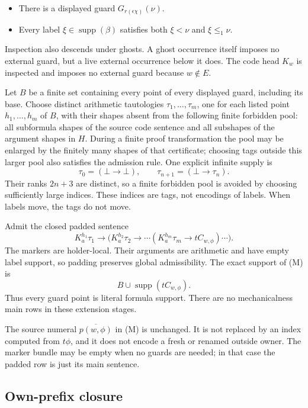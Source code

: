 \documentclass[
  11pt,
  letterpaper,
]{article}
\providecommand{\tightlist}{%
  \setlength{\itemsep}{0pt}\setlength{\parskip}{0pt}}
\begin{document}
\begin{itemize}
\tightlist
\item
  There is a displayed guard \(G_{r(\epsilon\chi)}(\nu)\).
\item
  Every label \(\xi\in\operatorname{supp}(\beta)\) satisfies both
  \(\xi<\nu\) and \(\xi\leq_1\nu\).
\end{itemize}

Inspection also descends under ghosts. A ghost occurrence itself imposes
no external guard, but a live external occurrence below it does. The
code head \(K_w\) is inspected and imposes no external guard because
\(w\notin E\).

Let \(B\) be a finite set containing every point of every displayed
guard, including its base. Choose distinct arithmetic tautologies
\(\tau_1,\ldots,\tau_m\), one for each listed point \(h_1,\ldots,h_m\)
of \(B\), with their shapes absent from the following finite forbidden
pool: all subformula shapes of the source code sentence and all
subshapes of the argument shapes in \(H\). During a finite proof
transformation the pool may be enlarged by the finitely many shapes of
that certificate; choosing tags outside this larger pool also satisfies
the admission rule. One explicit infinite supply is \[
\tau_0=(\bot\to\bot),\qquad \tau_{n+1}=(\bot\to\tau_n).
\] Their ranks \(2n+3\) are distinct, so a finite forbidden pool is
avoided by choosing sufficiently large indices. These indices are tags,
not encodings of labels. When labels move, the tags do not move.

Admit the closed padded sentence \[
K_a^{h_1}\tau_1\to
\bigl(K_a^{h_2}\tau_2\to\cdots
(K_a^{h_m}\tau_m\to tC_{w,\phi})\cdots\bigr).
\tag{M}
\] The markers are holder-local. Their arguments are arithmetic and have
empty label support, so padding preserves global admissibility. The
exact support of (M) is \[
B\cup\operatorname{supp}(tC_{w,\phi}).
\] Thus every guard point is literal formula support. There are no
mechanicalness main rows in these extension stages.

The source numeral \(\overline{p(w,\phi)}\) in (M) is unchanged. It is
not replaced by an index computed from \(t\phi\), and it does not encode
a fresh or renamed outside owner. The marker bundle may be empty when no
guards are needed; in that case the padded row is just its main
sentence.

\subsection{Own-prefix closure}\label{own-prefix-closure}
\end{document}
